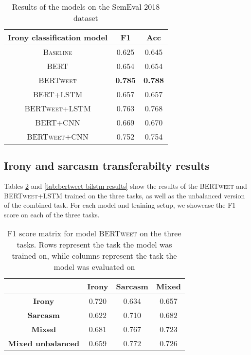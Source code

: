 \documentclass[10pt, a4paper]{article}
\begin{document}
\begin{table}[h]
   \caption{Results of the models on the SemEval-2018 dataset}
   \label{tab:semeval-2018}
   \begin{center}
   \begin{tabular}{|c|c|c|}
   \toprule
   Irony classification model & F1 & Acc\\
   \midrule
   \textsc{Baseline} & 0.625 & 0.645 \\
   \textsc{BERT} & 0.654 & 0.654 \\
   \textsc{BERTweet} & \textbf{0.785} & \textbf{0.788} \\
   \textsc{BERT+LSTM} & 0.657 & 0.657 \\
   \textsc{BERTweet+LSTM} & 0.763 & 0.768 \\
   \textsc{BERT+CNN} & 0.669 & 0.670 \\
   \textsc{BERTweet+CNN} & 0.752 & 0.754 \\
   \bottomrule
   \end{tabular}
   \end{center}
\end{table}

\subsection{Irony and sarcasm transferabilty results}\label{task-analysis}

Tables \ref{tab:bertweet-results} and \ref{tab:bertweet-bilstm-results} show the results of the \textsc{BERTweet} and
\textsc{BERTweet+LSTM} trained on the three tasks, as well as the unbalanced version of the combined task. For each model
and training setup, we showcase the F1 score on each of the three tasks.

\begin{table}[h!]
   \centering
   \begin{tabular}{|c|c|c|c|}
       \hline
        & \textbf{Irony} & \textbf{Sarcasm} & \textbf{Mixed} \\ \hline
       \textbf{Irony} & 0.720 & 0.634 & 0.657 \\ \hline
       \textbf{Sarcasm} & 0.622 & 0.710 & 0.682 \\ \hline
       \textbf{Mixed} & 0.681 & 0.767 & 0.723 \\ \hline
       \textbf{Mixed unbalanced} & 0.659 & 0.772 & 0.726\\ \hline
   \end{tabular}
   \caption{F1 score matrix for model \textsc{BERTweet} on the three tasks. Rows represent the task the model was trained on, 
   while columns represent the task the model was evaluated on}
   \label{tab:bertweet-results}
\end{table}
\end{document}
